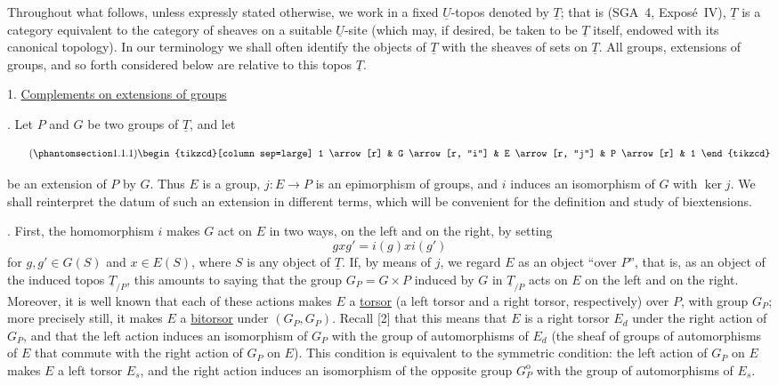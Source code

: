 Throughout what follows, unless expressly stated otherwise, we work in a
fixed $\underline U$-topos denoted by $\underline T$; that is (SGA~4,
Expos\'e~IV), $\underline T$ is a category equivalent to the category of
sheaves on a suitable $\underline U$-site (which may, if desired, be taken
to be $\underline T$ itself, endowed with its canonical topology). In our
terminology we shall often identify the objects of $\underline T$ with
the sheaves of sets on $\underline T$. All groups, extensions of groups,
and so forth considered below are relative to this topos $\underline T$.

1. \underline{Complements on extensions of groups}

. Let $P$ and $G$ be two groups of $\underline T$, and let

\begin{equation}\tag{\SGARefTarget{sga7.sga7i.evii.n1-1-1}{1.1.1}}
\begin{tikzcd}[column sep=large]
1 \arrow[r] & G \arrow[r, "i"] & E \arrow[r, "j"] & P \arrow[r] & 1
\end{tikzcd}
\end{equation}

be an extension of $P$ by $G$. Thus $E$ is a group,
$j:E\longrightarrow P$ is an epimorphism of groups, and $i$ induces an
isomorphism of $G$ with $\ker j$. We shall reinterpret the datum of such
an extension in different terms, which will be convenient for the
definition and study of biextensions.


. First, the homomorphism $i$ makes $G$ act on $E$ in two ways, on
the left and on the right, by setting
\[
 gxg'=i(g)xi(g')
\]
for $g,g'\in G(S)$ and $x\in E(S)$, where $S$ is any object of
$\underline T$. If, by means of $j$, we regard $E$ as an object ``over
$P$'', that is, as an object of the induced topos $\underline T_{/P}$,
this amounts to saying that the group $G_P=G\times P$ induced by $G$ in
$\underline T_{/P}$ acts on $E$ on the left and on the right. Moreover,
it is well known that each of these actions makes $E$ a
\underline{torsor} (a left torsor and a right torsor, respectively) over
$P$, with group $G_P$; more precisely still, it makes $E$ a
\underline{bitorsor} under $(G_P,G_P)$. Recall [2] that this means that
$E$ is a right torsor $E_d$ under the right action of $G_P$, and that the
left action induces an isomorphism of $G_P$ with the group of
automorphisms of $E_d$ (the sheaf of groups of automorphisms of $E$ that
commute with the right action of $G_P$ on $E$). This condition is
equivalent to the symmetric condition: the left action of $G_P$ on $E$
makes $E$ a left torsor $E_s$, and the right action induces an
isomorphism of the opposite group $G_P^{\mathrm o}$ with the group of
automorphisms of $E_s$.

